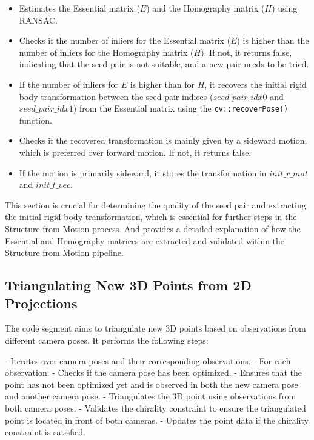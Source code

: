 \documentclass{article}
\begin{document}
\begin{itemize}
  \item Estimates the Essential matrix ($E$) and the Homography matrix ($H$) using RANSAC.
  \item Checks if the number of inliers for the Essential matrix ($E$) is higher than the number of inliers for the Homography matrix ($H$). If not, it returns false, indicating that the seed pair is not suitable, and a new pair needs to be tried.
  \item If the number of inliers for $E$ is higher than for $H$, it recovers the initial rigid body transformation between the seed pair indices ($seed\_pair\_idx0$ and $seed\_pair\_idx1$) from the Essential matrix using the \texttt{cv::recoverPose()} function.
  \item Checks if the recovered transformation is mainly given by a sideward motion, which is preferred over forward motion. If not, it returns false.
  \item If the motion is primarily sideward, it stores the transformation in $init\_r\_mat$ and $init\_t\_vec$.
\end{itemize}

This section is crucial for determining the quality of the seed pair and extracting the initial rigid body transformation, which is essential for further steps in the Structure from Motion process. And provides a detailed explanation of how the Essential and Homography matrices are extracted and validated within the Structure from Motion pipeline.


\subsection{Triangulating New 3D Points from 2D Projections}

The code segment aims to triangulate new 3D points based on observations from different camera poses. It performs the following steps:

- Iterates over camera poses and their corresponding observations.
- For each observation:
  - Checks if the camera pose has been optimized.
  - Ensures that the point has not been optimized yet and is observed in both the new camera pose and another camera pose.
  - Triangulates the 3D point using observations from both camera poses.
  - Validates the chirality constraint to ensure the triangulated point is located in front of both cameras.
  - Updates the point data if the chirality constraint is satisfied.
\end{document}
